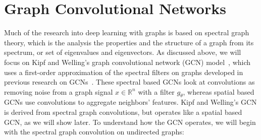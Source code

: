 
\section{Graph Convolutional Networks}
Much of the research into deep learning with graphs is based on spectral graph theory, which is the analysis the properties and the structure of a graph from its spectrum, or set of eigenvalues and eigenvectors. As discussed above, we will focus on Kipf and Welling's graph convolutional network (GCN) model~\cite{Kipf2016}, which uses a first-order approximation of the spectral filters on graphs developed in previous research on GCNs~\cite{Bruna2013}. These spectral based GCNs look at convolutions as removing noise from a graph signal $x \in \mathbb{R}^n$ with a filter $g_\theta$, whereas spatial based GCNs use convolutions to aggregate neighbors' features. Kipf and Welling's GCN is derived from spectral graph convolutions, but operates like a spatial based GCN, as we will show later. To understand how the GCN operates, we will begin with the spectral graph convolution on undirected graphs:

